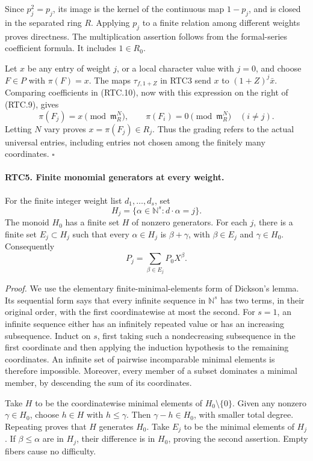 \documentclass[11pt,a4paper]{article}
\numberwithin{equation}{section}
\theoremstyle{remark}\newtheorem{remark}[theorem]{Remark}
\begin{document}
Since \(p_j^2=p_j\), its image is the kernel of the continuous
map \(1-p_j\), and is closed in the separated ring \(R\).
Applying \(p_j\) to a finite relation among different weights
proves directness.  The multiplication assertion follows from the
formal-series coefficient formula.  It includes \(1\in R_0\).

Let \(x\) be any entry of weight \(j\), or a local character
value with \(j=0\), and choose \(F\in P\) with \(\pi(F)=x\).
The maps \(\tau_{f,1+Z}\) in RTC3 send \(x\) to
\((1+Z)^j\bar x\).  Comparing coefficients in (RTC.10), now
with this expression on the right of (RTC.9), gives
\[
 \pi(F_j)=x\pmod{\mathfrak m_R^N},\qquad
 \pi(F_i)=0\pmod{\mathfrak m_R^N}\quad(i\ne j).
\]
Letting \(N\) vary proves \(x=\pi(F_j)\in R_j\).
Thus the grading refers to the actual universal entries, including
entries not chosen among the finitely many coordinates.
\hfill\(\square\)

\paragraph{RTC5. Finite monomial generators at every weight.}
\label{claim:RTC5}
For the finite integer weight list \(d_1,\ldots,d_s\), set
\[
 H_j=\{\alpha\in\mathbb N^s:d\cdot\alpha=j\}.
\]
The monoid \(H_0\) has a finite set \(H\) of nonzero generators.
For each \(j\), there is a finite set \(E_j\subset H_j\) such
that every \(\alpha\in H_j\) is \(\beta+\gamma\), with
\(\beta\in E_j\) and \(\gamma\in H_0\).  Consequently
\[
 P_j=\sum_{\beta\in E_j}P_0X^\beta.
                                                        \tag{RTC.11}
\]

\emph{Proof.}
We use the elementary finite-minimal-elements form of Dickson's
lemma.  Its sequential form says that every infinite sequence in
\(\mathbb N^s\) has two terms, in their original order, with
the first coordinatewise at most the second.  For \(s=1\), an
infinite sequence either has an infinitely repeated value or has an
increasing subsequence.  Induct on \(s\), first taking such a
nondecreasing subsequence in the first coordinate and then applying
the induction hypothesis to the remaining coordinates.  An infinite
set of pairwise incomparable minimal elements is therefore impossible.
Moreover, every member of a subset dominates a minimal member, by
descending the sum of its coordinates.

Take \(H\) to be the coordinatewise minimal elements of
\(H_0\setminus\{0\}\).  Given any nonzero \(\gamma\in H_0\),
choose \(h\in H\) with \(h\leq\gamma\).  Then
\(\gamma-h\in H_0\), with smaller total degree.  Repeating
proves that \(H\) generates \(H_0\).  Take \(E_j\) to be the
minimal elements of \(H_j\).  If \(\beta\leq\alpha\) are in
\(H_j\), their difference is in \(H_0\), proving the second
assertion.  Empty fibers cause no difficulty.
\end{document}
